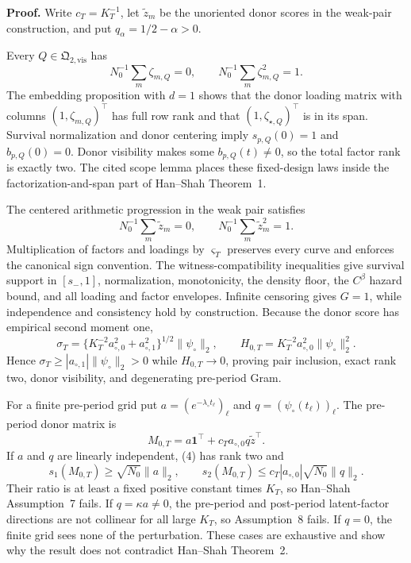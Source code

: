 \textbf{Proof.}
Write \(c_T=K_T^{-1}\), let \(\widetilde z_m\) be the unoriented donor scores in the weak-pair construction, and put \(q_\alpha=1/2-\alpha>0\).

Every \(Q\in\mathfrak Q_{2,\mathrm{vis}}\) has
\[
 N_0^{-1}\sum_m\zeta_{m,Q}=0,
 \qquad N_0^{-1}\sum_m\zeta_{m,Q}^2=1.                 \tag{1}
\]
The embedding proposition with \(d=1\) shows that the donor loading matrix with columns \((1,\zeta_{m,Q})^\top\) has full row rank and that \((1,\zeta_{\star,Q})^\top\) is in its span. Survival normalization and donor centering imply \(s_{p,Q}(0)=1\) and \(b_{p,Q}(0)=0\). Donor visibility makes some \(b_{p,Q}(t)\ne0\), so the total factor rank is exactly two. The cited scope lemma places these fixed-design laws inside the factorization-and-span part of Han--Shah Theorem~1.

The centered arithmetic progression in the weak pair satisfies
\[
 N_0^{-1}\sum_m\widetilde z_m=0,
 \qquad N_0^{-1}\sum_m\widetilde z_m^2=1.               \tag{2}
\]
Multiplication of factors and loadings by \(\varsigma_T\) preserves every curve and enforces the canonical sign convention. The witness-compatibility inequalities give survival support in \([s_-,1]\), normalization, monotonicity, the density floor, the \(C^\beta\) hazard bound, and all loading and factor envelopes. Infinite censoring gives \(G=1\), while independence and consistency hold by construction. Because the donor score has empirical second moment one,
\[
 \sigma_T=\{K_T^{-2}a_{\circ,0}^2+a_{\circ,1}^2\}^{1/2}
 \|\psi_\circ\|_2,
 \qquad H_{0,T}=K_T^{-2}a_{\circ,0}^2\|\psi_\circ\|_2^2. \tag{3}
\]
Hence \(\sigma_T\ge|a_{\circ,1}|\|\psi_\circ\|_2>0\) while \(H_{0,T}\to0\), proving pair inclusion, exact rank two, donor visibility, and degenerating pre-period Gram.

For a finite pre-period grid put \(a=(e^{-\lambda_\circ t_\ell})_\ell\) and \(q=(\psi_\circ(t_\ell))_\ell\). The pre-period donor matrix is
\[
 M_{0,T}=a\mathbf1^\top+c_Ta_{\circ,0}q\widetilde z^\top. \tag{4}
\]
If \(a\) and \(q\) are linearly independent, (4) has rank two and
\[
 s_1(M_{0,T})\ge\sqrt{N_0}\|a\|_2,
 \qquad s_2(M_{0,T})\le c_T|a_{\circ,0}|\sqrt{N_0}\|q\|_2. \tag{5}
\]
Their ratio is at least a fixed positive constant times \(K_T\), so Han--Shah Assumption~7 fails. If \(q=\kappa a\ne0\), the pre-period and post-period latent-factor directions are not collinear for all large \(K_T\), so Assumption~8 fails. If \(q=0\), the finite grid sees none of the perturbation. These cases are exhaustive and show why the result does not contradict Han--Shah Theorem~2.


